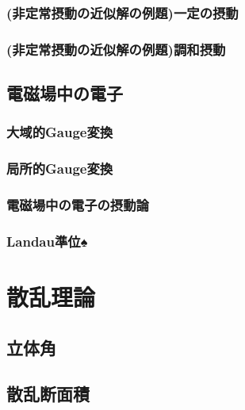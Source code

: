 \documentclass{report}
\begin{document}
      \subsection{(非定常摂動の近似解の例題)一定の摂動}
        
      \subsection{(非定常摂動の近似解の例題)調和摂動}
        
    \section{電磁場中の電子}
      
      \subsection{大域的Gauge変換}
        
      \subsection{局所的Gauge変換}
        
      \subsection{電磁場中の電子の摂動論}
        
      \subsection{Landau準位♠}
        
  \chapter{散乱理論}
    \section{立体角}
      
    \section{散乱断面積}
      
\end{document}
